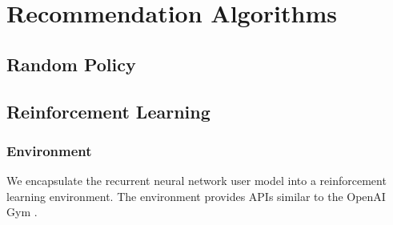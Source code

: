 
\chapter{Recommendation Algorithms}


\section{Random Policy}


\section{Reinforcement Learning}

    \subsection{Environment}

        We encapsulate the recurrent neural network user model into a reinforcement learning environment.
        The environment provides APIs similar to the OpenAI Gym \cite{brockman_openai_2016}.










